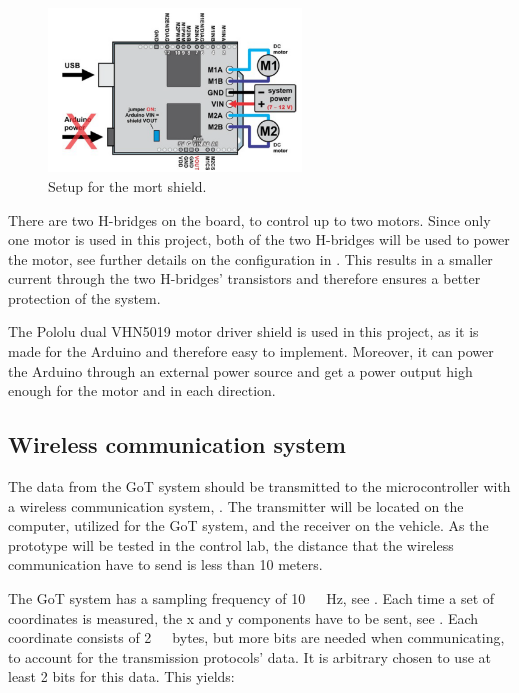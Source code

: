 \begin{figure}[H]
	\centering
	\includegraphics[width=0.60\textwidth]{figures/MotordriverIO.png}
		\caption{Setup for the mort shield.}
	\label{MotorDriveIO}
\end{figure}


There are two H-bridges on the board, to control up to two motors. Since only one motor is used in this project, both of the two H-bridges will be used to power the motor, see further details on the configuration in . This results in a smaller current through the two H-bridges' transistors and therefore ensures a better protection of the system.\cite{PCorporation}

%
The Pololu dual VHN5019 motor driver shield is used in this project, as it is made for the Arduino and therefore easy to implement. Moreover, it can power the Arduino through an external power source and get a power output high enough for the motor and in each direction.\cite{STMicroelectronics}

\subsection{Wireless communication system}
The data from the GoT system should be transmitted to the microcontroller with a wireless communication system, . The transmitter will be located on the computer, utilized for the GoT system, and the receiver on the vehicle. As the prototype will be tested in the control lab, the distance that the wireless communication have to send is less than 10 meters.

The GoT system has a sampling frequency of \si{10\ Hz}, see . Each time a set of coordinates is measured, the x and y components have to be sent, see . Each coordinate consists of \si{2\ bytes}, but more bits are needed when communicating, to account for the transmission protocols' data. It is arbitrary chosen to use at least 2 bits for this data. This yields:

